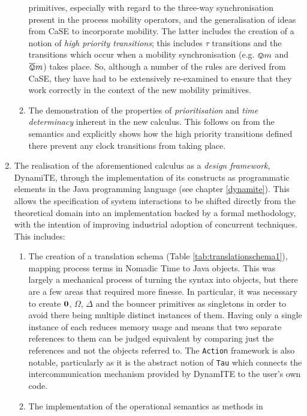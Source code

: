 \begin{enumerate}
\begin{enumerate}[\bfseries {C1.}1]
  primitives, especially with regard to the three-way synchronisation
  present in the process mobility operators, and the generalisation of
  ideas from CaSE to incorporate mobility.  The latter includes the
  creation of a notion of \emph{high priority transitions}; this
  includes $\tau$ transitions and the transitions which occur when a
  mobility synchronisation (e.g. $\varovee m$ and $\overline{\varovee}{m}$) takes
  place.  So, although a number of the rules are derived from CaSE,
  they have had to be extensively re-examined to ensure that they work
  correctly in the context of the new mobility primitives.
\item The demonstration of the properties of \emph{prioritisation} and
  \emph{time determinacy} inherent in the new calculus.  This follows
  on from the semantics and explicitly shows how the high priority
  transitions defined there prevent any clock transitions from taking
  place.
\end{enumerate}
\item The realisation of the aforementioned calculus as a \emph{design
  framework}, DynamiTE, through the implementation of its constructs
  as programmatic elements in the Java programming language (see
  chapter \ref{dynamite}).  This allows the specification of system
  interactions to be shifted directly from the theoretical domain into
  an implementation backed by a formal methodology, with the intention
  of improving industrial adoption of concurrent techniques.  This includes:
\begin{enumerate}[\bfseries {C2.}1]
\item The creation of a translation schema (Table
  \ref{tab:translationschema1}), mapping process terms in Nomadic Time
  to Java objects.  This was largely a mechanical process of turning
  the syntax into objects, but there are a few areas that required
  more finesse.  In particular, it was necessary to create $\textbf{0}$,
  $\Omega$, $\Delta$ and the bouncer primitives as singletons in order
  to avoid there being multiple distinct instances of them.  Having
  only a single instance of each reduces memory usage and means that
  two separate references to them can be judged equivalent by
  comparing just the references and not the objects referred to.  The
  \texttt{Action} framework is also notable, particularly as it is the
  abstract notion of \texttt{Tau} which connects the
  intercommunication mechanism provided by DynamITE to the user's own
  code.
\item The implementation of the operational semantics as methods in

\end{enumerate}
\end{enumerate}
